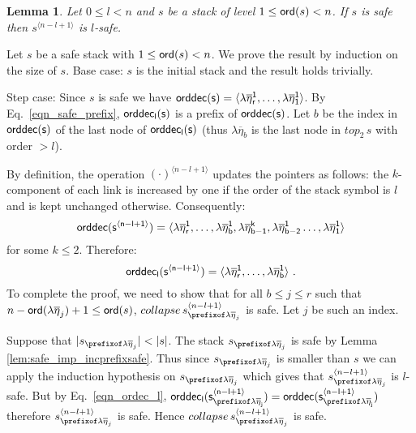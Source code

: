 \documentclass[a4paper]{article}
\newtheorem{lemma}{Lemma}[section]
\theoremstyle{remark}
\theoremstyle{definition}
\newcommand\orddec{\sf orddec}
\begin{document}
\begin{lemma}
\label{lem:incrk_qsafe}
Let $0\leq l < n$ and $s$ be a stack of level $1\leq {\sf ord}(s) <n$.
If $s$ is safe then $s^{\langle n-l+1 \rangle}$ is $l$-safe.
\end{lemma}
\proof  Let $s$ be a safe stack with $1\leq {\sf ord}(s) <n$. We prove the result by induction on the size of $s$.
Base case: $s$ is the initial stack and the result holds trivially.

Step case: Since $s$ is safe we have
$\orddec(s) = \langle \lambda \overline{\eta}_r^1
, \ldots, \lambda \overline{\eta}_1^1   \rangle$.
By Eq.\ \ref{eqn_safe_prefix}, $\orddec_l(s)$ is a prefix of $\orddec(s)$.
Let $b$ be the index in $\orddec(s)$ of the last node of $\orddec_l(s)$
(thus $\lambda\overline\eta_b$ is the last node in $top_2\, s$ with order $>l$).

By definition, the operation $(\cdot)^{\langle n-l+1 \rangle}$ updates the pointers as follows:
the $k$-component of each link is increased by one if the order of
the stack symbol is $l$ and is kept unchanged otherwise.
Consequently:
\begin{equation*}
\orddec(s^{\langle n-l+1 \rangle}) = \langle
\lambda \overline{\eta}_r^1, \ldots,  \lambda \overline{\eta}_{b}^1, \lambda \overline{\eta}_{b-1}^{k}, \lambda \overline{\eta}_{b-2}^1 \ldots,
 \lambda \overline{\eta}_1^{1} \rangle
\end{equation*}
for some $k\leq 2$. Therefore:
\begin{equation*}
\orddec_l(s^{\langle n-l+1 \rangle}) = \langle \lambda \overline{\eta}_r^1
, \ldots, \lambda \overline{\eta}_b^1 \rangle\ .
\label{eqn_ordec_l}
\end{equation*}
To complete the proof, we need to show that
for all $b\leq j \leq r$ such that $n-{\sf ord}(\lambda \overline{\eta}_{j}) +1 \leq {\sf ord}(s)$, $collapse\, s^{\langle n-l+1 \rangle}_{\prefixof \lambda \overline{\eta}_{j}}$ is safe. Let $j$ be such an index.

Suppose that $|s_{\prefixof \lambda\overline\eta_j}|<|s|$.
The stack $s_{\prefixof \lambda\overline\eta_j}$ is safe by Lemma \ref{lem:safe_imp_incprefixsafe}. Thus since $s_{\prefixof \lambda\overline\eta_j}$ is smaller than $s$ we can apply the induction hypothesis on $s_{\prefixof \lambda\overline\eta_j}$ which gives that $s_{\prefixof \lambda\overline\eta_j}^{\langle n-l+1\rangle}$ is $l$-safe. But by
Eq.\ \ref{eqn_ordec_l},  $\orddec_l(s_{\prefixof \lambda\overline\eta_j}^{\langle n-l+1\rangle})
= \orddec(s_{\prefixof \lambda\overline\eta_j}^{\langle n-l+1\rangle})$
therefore $s_{\prefixof \lambda\overline\eta_j}^{\langle n-l+1\rangle}$
is safe. Hence $collapse\, s_{\prefixof \lambda\overline\eta_j}^{\langle n-l+1\rangle}$ is safe.
\end{document}
